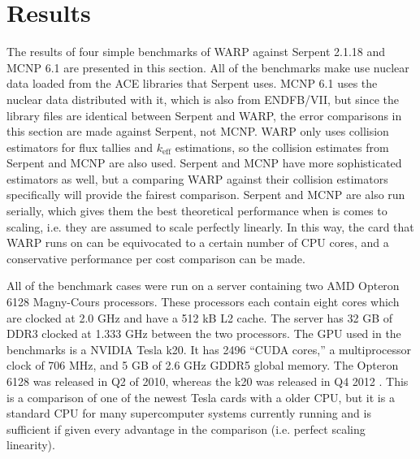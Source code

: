 \chapter{Results}
\label{chap:results}

The results of four simple benchmarks of WARP against Serpent 2.1.18 and MCNP 6.1 are presented in this section.  All of the benchmarks make use nuclear data loaded from the ACE libraries that Serpent uses.  MCNP 6.1 uses the nuclear data distributed with it, which is also from ENDFB/VII, but since the library files are identical between Serpent and WARP, the error comparisons in this section are made against Serpent, not MCNP.  WARP only uses collision estimators for flux tallies and $k_\mathrm{eff}$ estimations, so the collision estimates from Serpent and MCNP are also used.  Serpent and MCNP have more sophisticated estimators as well, but a comparing WARP against their collision estimators specifically will provide the fairest comparison.  Serpent and MCNP are also run serially, which gives them the best theoretical performance when is comes to scaling, i.e. they are assumed to scale perfectly linearly.  In this way, the card that WARP runs on can be equivocated to a certain number of CPU cores, and a conservative performance per cost comparison can be made.

All of the benchmark cases were run on a server containing two AMD Opteron 6128 Magny-Cours processors.  These processors each contain eight cores which are clocked at 2.0 GHz and have a 512 kB L2 cache.  The server has 32 GB of DDR3 clocked at 1.333 GHz between the two processors.  The GPU used in the benchmarks is a NVIDIA Tesla k20.  It has 2496 ``CUDA cores,'' a multiprocessor clock of 706 MHz, and 5 GB of 2.6 GHz GDDR5 global memory.  The Opteron 6128 was released in Q2 of 2010, whereas the k20 was released in Q4 2012 \cite{opterondate,k20date}.  This is a comparison of one of the newest Tesla cards with a older CPU, but it is a standard CPU for many supercomputer systems currently running and is sufficient if given every advantage in the comparison (i.e. perfect scaling linearity).


